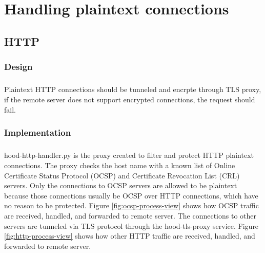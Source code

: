 \documentclass[mscthesis]{usiinfthesis}
\begin{document}
\chapter{Handling plaintext connections}\label{cha:plaintext}

\section{HTTP}
\subsection{Design}
\paragraph{}
Plaintext HTTP connections should be tunneled and encrpte through TLS proxy, if the remote server does not support encrypted connections, the request should fail.
\subsection{Implementation}
\paragraph{}
hood-http-handler.py is the proxy created to filter and protect HTTP plaintext connections. The proxy checks the host name with a known list of Online Certificate Status Protocol (OCSP) and Certificate Revocation List (CRL) servers. Only the connections to OCSP servers are allowed to be plaintext because those connections usually be OCSP over HTTP connections, which have no reason to be protected. Figure \ref{fig:ocsp-process-view} shows how OCSP traffic are received, handled, and forwarded to remote server. The connections to other servers are tunneled via TLS protocol through the hood-tls-proxy service. Figure \ref{fig:http-process-view} shows how other HTTP traffic are received, handled, and forwarded to remote server.
\end{document}
